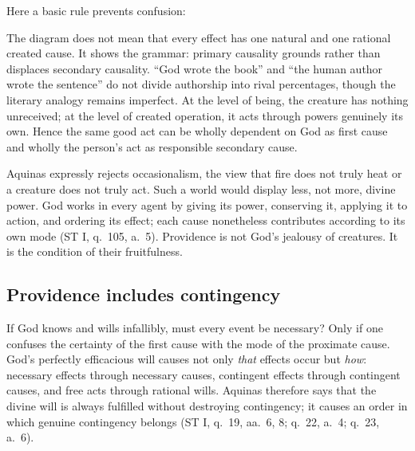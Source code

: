Here a basic rule prevents confusion:

\begin{center}
\end{center}

The diagram does not mean that every effect has one natural and one rational created cause. It shows the grammar: primary causality grounds rather than displaces secondary causality. ``God wrote the book'' and ``the human author wrote the sentence'' do not divide authorship into rival percentages, though the literary analogy remains imperfect. At the level of being, the creature has nothing unreceived; at the level of created operation, it acts through powers genuinely its own. Hence the same good act can be wholly dependent on God as first cause and wholly the person's act as responsible secondary cause.

Aquinas expressly rejects occasionalism, the view that fire does not truly heat or a creature does not truly act. Such a world would display less, not more, divine power. God works in every agent by giving its power, conserving it, applying it to action, and ordering its effect; each cause nonetheless contributes according to its own mode (ST I, q.~105, a.~5). Providence is not God's jealousy of creatures. It is the condition of their fruitfulness.

\subsection{Providence includes contingency}

If God knows and wills infallibly, must every event be necessary? Only if one confuses the certainty of the first cause with the mode of the proximate cause. God's perfectly efficacious will causes not only \emph{that} effects occur but \emph{how}: necessary effects through necessary causes, contingent effects through contingent causes, and free acts through rational wills. Aquinas therefore says that the divine will is always fulfilled without destroying contingency; it causes an order in which genuine contingency belongs (ST I, q.~19, aa.~6, 8; q.~22, a.~4; q.~23, a.~6).

